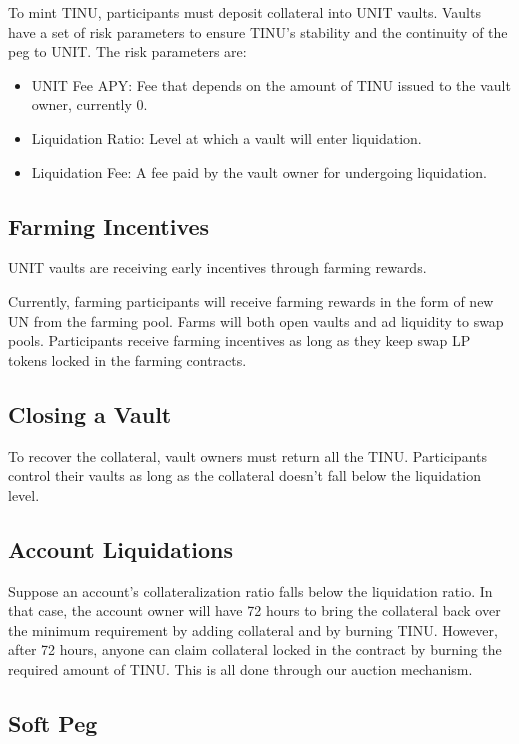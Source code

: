 \documentclass[12pt]{article}
\begin{document}
To mint TINU, participants must deposit collateral into UNIT vaults. Vaults have a set of risk parameters to ensure TINU’s stability and the continuity of the peg to UNIT. The risk parameters are:

\begin{itemize}
\item UNIT Fee APY: Fee that depends on the amount of TINU issued to the vault owner, currently 0.
\item Liquidation Ratio: Level at which a vault will enter liquidation.
\item Liquidation Fee: A fee paid by the vault owner for undergoing liquidation.
\end{itemize}


\subsection{Farming Incentives}

UNIT vaults are receiving early incentives through farming rewards.

Currently, farming participants will receive farming rewards in the form of new UN from the farming pool. Farms will both open vaults and ad liquidity to swap pools. Participants receive farming incentives as long as they keep swap LP tokens locked in the farming contracts.


\subsection{Closing a Vault}

To recover the collateral, vault owners must return all the TINU. Participants control their vaults as long as the collateral doesn’t fall below the liquidation level. 


\subsection{Account Liquidations}

Suppose an account's collateralization ratio falls below the liquidation ratio. In that case, the account owner will have 72 hours to bring the collateral back over the minimum requirement by adding collateral and by burning TINU. However, after 72 hours, anyone can claim collateral locked in the contract by burning the required amount of TINU. This is all done through our auction mechanism.


\subsection{Soft Peg}
\end{document}

